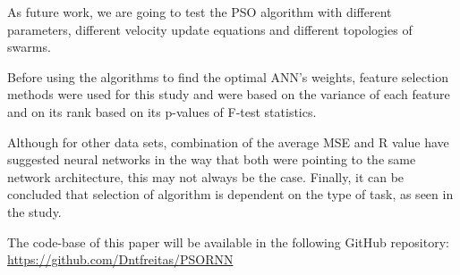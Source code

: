 \begin{table}[htbp]
\centering
\caption{Best MSE values and respective R coefficients of tests performed with LMA and PSO for each data set.}
\label{tab:final}
\end{table}

As future work, we are going to test the PSO algorithm with different parameters, different velocity update equations and different topologies of swarms.

Before using the algorithms to find the optimal ANN's weights, feature selection methods were used for this study and were based on the variance of each feature and on its rank based on its p-values of F-test statistics.

Although for other data sets, combination of the average MSE and R value have suggested neural networks in the way that both were pointing to the same network architecture, this may not always be the case. Finally, it can be concluded that selection of algorithm is dependent on the type of task, as seen in the study.

The code-base of this paper will be available in the following GitHub repository: \url{https://github.com/Dntfreitas/PSORNN}